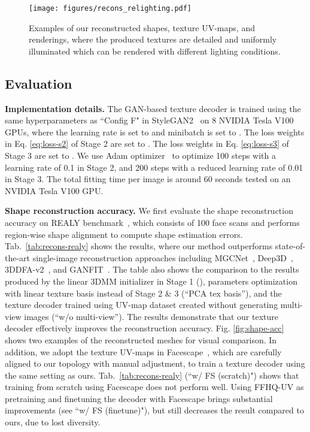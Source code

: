 \documentclass[10pt,twocolumn,letterpaper]{article}
\begin{document}
\begin{figure*}[!t]
  \centering
   \texttt{[image: figures/recons\_relighting.pdf]}
   \caption{Examples of our reconstructed shapes, texture UV-maps, and renderings, where the produced textures are detailed and uniformly illuminated which can be rendered with different lighting conditions.}
   \label{fig:recons-relighting}
\end{figure*}




\vspace{-2mm}
\subsection{Evaluation}
\vspace{-1mm}


\noindent\textbf{Implementation details.}
The GAN-based texture decoder  is trained using the same hyperparameters as ``Config F" in StyleGAN2~\cite{karras2020analyzing} on 8 NVIDIA Tesla V100 GPUs, where the learning rate is set to  and minibatch is set to .
The loss weights  in Eq. \eqref{eq:loss-s2} of Stage 2 are set to .
The loss weights  in Eq. \eqref{eq:loss-s3} of Stage 3 are set to .
We use Adam optimizer~\cite{kingma2014adam} to optimize 100 steps with a learning rate of 0.1 in Stage 2, and 200 steps with a reduced learning rate of 0.01 in Stage 3.
The total fitting time per image is around 60 seconds tested on an NVIDIA Tesla V100 GPU.


\vspace{1mm}
\noindent\textbf{Shape reconstruction accuracy.}
We first evaluate the shape reconstruction accuracy on REALY benchmark~\cite{chai2022realy}, which consists of 100 face scans and performs region-wise shape alignment to compute shape estimation errors.
Tab.~\ref{tab:recons-realy} shows the results, where our method outperforms state-of-the-art single-image reconstruction approaches including MGCNet~\cite{shang2020self}, Deep3D~\cite{deng2019accurate}, 3DDFA-v2~\cite{guo2020towards}, and GANFIT~\cite{gecer2019ganfit}. 
The table also shows the comparison to the results produced by the linear 3DMM initializer in Stage 1 (), parameters optimization with linear texture basis instead of Stage 2 \& 3 (``PCA tex basis''), and the texture decoder trained using UV-map dataset created without generating multi-view images (``w/o multi-view''). 
The results demonstrate that our texture decoder effectively improves the reconstruction accuracy.
Fig. \ref{fig:shape-acc} shows two examples of the reconstructed meshes for visual comparison.
In addition, we adopt the texture UV-maps in Facescape~\cite{yang2020facescape}, which are carefully aligned to our topology with manual adjustment, to train a texture decoder using the same setting as ours.
Tab.~\ref{tab:recons-realy} (``w/ FS (scratch)") shows that training from scratch using Facescape does not perform well.
Using FFHQ-UV as pretraining and finetuning the decoder with Facescape brings substantial improvements (see ``w/ FS (finetune)"), but still decreases the result compared to ours, due to lost diversity.
\end{document}
